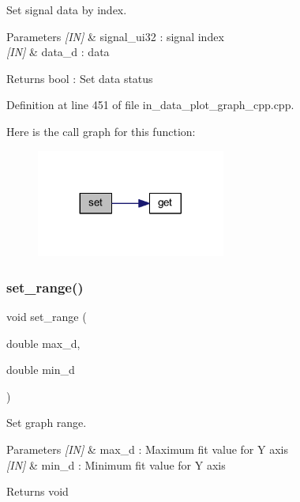 Set signal data by index. 


\begin{DoxyParams}{Parameters}
{\em \mbox{[}\+I\+N\mbox{]}} & signal\+\_\+ui32 \+: signal index \\
\hline
{\em \mbox{[}\+I\+N\mbox{]}} & data\+\_\+d \+: data \\
\hline
\end{DoxyParams}
\begin{DoxyReturn}{Returns}
bool \+: Set data status 
\end{DoxyReturn}


Definition at line 451 of file in\+\_\+data\+\_\+plot\+\_\+graph\+\_\+cpp.\+cpp.

Here is the call graph for this function\+:
\nopagebreak
\begin{figure}[H]
\begin{center}
\leavevmode
\includegraphics[width=176pt]{group__data__plot_ga3e91f94c70d6bd1bc3b1aa640a92063a_cgraph}
\end{center}
\end{figure}
\mbox{\label{group__data__plot_ga5cd933820f813c0a8ca2785c221f2c6a}} 
\subsubsection{set\_range()}
{\footnotesize\ttfamily void set\+\_\+range (\begin{DoxyParamCaption}\item[{double}]{max\+\_\+d,  }\item[{double}]{min\+\_\+d }\end{DoxyParamCaption})}



Set graph range. 


\begin{DoxyParams}{Parameters}
{\em \mbox{[}\+I\+N\mbox{]}} & max\+\_\+d \+: Maximum fit value for Y axis \\
\hline
{\em \mbox{[}\+I\+N\mbox{]}} & min\+\_\+d \+: Minimum fit value for Y axis \\
\hline
\end{DoxyParams}
\begin{DoxyReturn}{Returns}
void 
\end{DoxyReturn}


